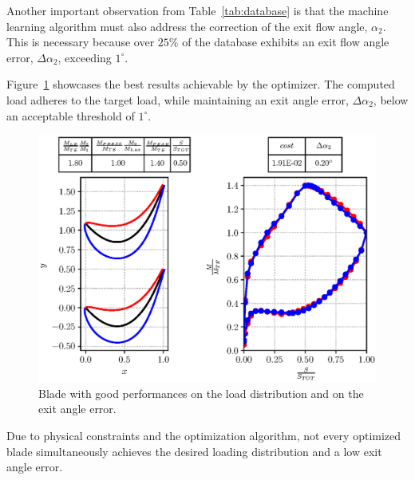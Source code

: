 Another important observation from Table~\ref{tab:database} is that the machine learning algorithm must also address the correction of the exit flow angle, $\alpha_2$. 
This is necessary because over $25\%$ of the database exhibits an exit flow angle error, $\Delta \alpha_2$, exceeding $1^{\circ}$.

Figure~\ref{fig:goodBlade} showcases the best results achievable by the optimizer. 
The computed load adheres to the target load, while maintaining an exit angle error, $\Delta \alpha_2$, below an acceptable threshold of $1^\circ$. 

\begin{figure}[H]
    \centering
    \hspace*{-0.6cm}
    \includegraphics[scale=\scaleBlade]{./images/bladeVal0305.eps}
    \caption{Blade with good performances on the load distribution and on the exit angle error.}
    \label{fig:goodBlade}
\end{figure}

% 

Due to physical constraints and the optimization algorithm, not every optimized blade simultaneously achieves the desired loading distribution and a low exit angle error. 

